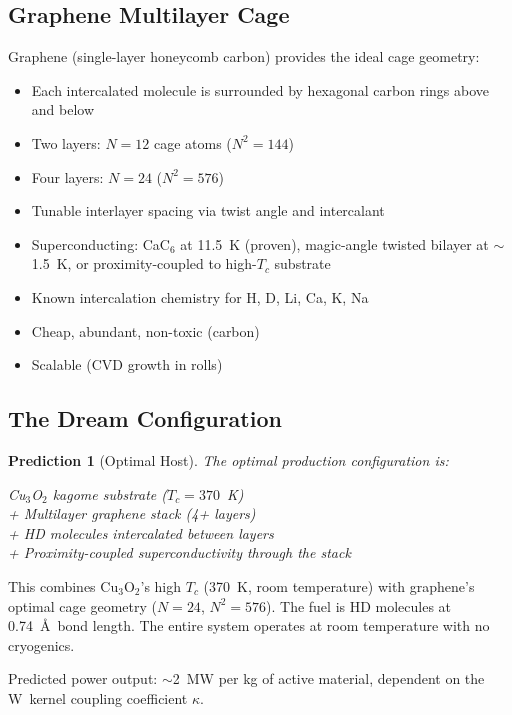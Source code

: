 \documentclass[11pt, a4paper]{article}
\newtheorem{prediction}{Prediction}[section]
\begin{document}
\subsection{Graphene Multilayer Cage}

Graphene (single-layer honeycomb carbon) provides the ideal
cage geometry:
\begin{itemize}[nosep]
  \item Each intercalated molecule is surrounded by hexagonal
        carbon rings above and below
  \item Two layers: $N = 12$ cage atoms ($N^2 = 144$)
  \item Four layers: $N = 24$ ($N^2 = 576$)
  \item Tunable interlayer spacing via twist angle and intercalant
  \item Superconducting: CaC$_6$ at 11.5~K (proven),
        magic-angle twisted bilayer at $\sim$1.5~K, or
        proximity-coupled to high-$T_c$ substrate
  \item Known intercalation chemistry for H, D, Li, Ca, K, Na
  \item Cheap, abundant, non-toxic (carbon)
  \item Scalable (CVD growth in rolls)
\end{itemize}

\subsection{The Dream Configuration}

\begin{prediction}[Optimal Host]
The optimal production configuration is:
\begin{center}
Cu$_3$O$_2$ kagome substrate ($T_c = 370$~K) \\
+ Multilayer graphene stack (4+ layers) \\
+ HD molecules intercalated between layers \\
+ Proximity-coupled superconductivity through the stack
\end{center}
\end{prediction}

This combines Cu$_3$O$_2$'s high $T_c$ (370~K, room
temperature) with graphene's optimal cage geometry ($N = 24$,
$N^2 = 576$). The fuel is HD molecules at 0.74~\AA\ bond
length. The entire system operates at room temperature with
no cryogenics.

Predicted power output: $\sim$2~MW per kg of active material,
dependent on the W~kernel coupling coefficient $\kappa$.
\end{document}
